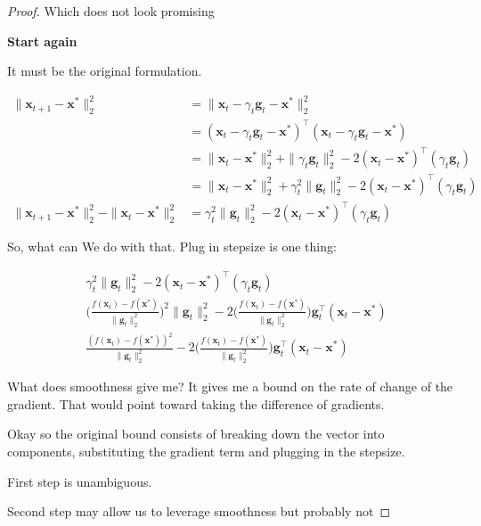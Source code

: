 \documentclass{article}
\begin{document}
\begin{proof}
	Which does not look promising
	
	\textbf{Start again}
	
	It must be the original formulation. 
	
	\begin{align}
		\| \mathbf{x}_{t+1} - \mathbf{x}^*\|^2_2 &= \| \mathbf{x}_t - \gamma_t \mathbf{g}_t - \mathbf{x}^*\|_2^2\\
		&= (\mathbf{x}_t - \gamma_t \mathbf{g}_t - \mathbf{x}^*)^\top (\mathbf{x}_t - \gamma_t \mathbf{g}_t - \mathbf{x}^*) \\
		&= \|\mathbf{x}_t-\mathbf{x}^*\|^2_2 + \|\gamma_t\mathbf{g}_t\|^2_2 - 2(\mathbf{x}_t-\mathbf{x}^*)^\top(\gamma_t \mathbf{g}_t) \\
		&= \|\mathbf{x}_t-\mathbf{x}^*\|^2_2 + \gamma_t^2\| \mathbf{g}_t\|^2_2 - 2(\mathbf{x}_t-\mathbf{x}^*)^\top(\gamma_t \mathbf{g}_t)\\
			\| \mathbf{x}_{t+1} - \mathbf{x}^*\|^2_2 -  \|\mathbf{x}_t-\mathbf{x}^*\|^2_2  &= \gamma_t^2\| \mathbf{g}_t\|^2_2 - 2(\mathbf{x}_t-\mathbf{x}^*)^\top(\gamma_t \mathbf{g}_t)
	\end{align}
	
	So, what can We do with that. Plug in stepsize is one thing:
	
	\begin{align}
		&\gamma_t^2\| \mathbf{g}_t\|^2_2 - 2(\mathbf{x}_t-\mathbf{x}^*)^\top(\gamma_t \mathbf{g}_t)\\
		& \bigg(\frac{f(\mathbf{x}_t) - f(\mathbf{x}^*)}{\|\mathbf{g}_t\|^2_2} \bigg)^2 \| \mathbf{g}_t\|^2_2 - 2 \bigg(\frac{f(\mathbf{x}_t) - f(\mathbf{x}^*)}{\|\mathbf{g}_t\|^2_2} \bigg) \mathbf{g}_t ^\top  (\mathbf{x}_t-\mathbf{x}^*)\\
		&\frac{(f(\mathbf{x}_t) - f(\mathbf{x}^*))^2}{\|\mathbf{g}_t\|^2_2}  - 2 \bigg(\frac{f(\mathbf{x}_t) - f(\mathbf{x}^*)}{\|\mathbf{g}_t\|^2_2} \bigg) \mathbf{g}_t ^\top  (\mathbf{x}_t-\mathbf{x}^*)
	\end{align}
	
	What does smoothness give me? It gives me a bound on the rate of change of the gradient.  That would point toward taking the difference of gradients. 
	
	Okay so the original bound consists of breaking down the vector into components, substituting the gradient term and plugging in the stepsize. 
	
	First step is unambiguous.
	
	Second step may allow us to leverage smoothness but probably not
	

\end{proof}
\end{document}
